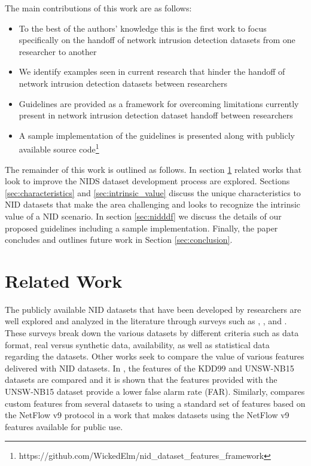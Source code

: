 \documentclass[conference]{IEEEtran}
\begin{document}
The main contributions of this work are as follows:

\begin{itemize}
    \item To the best of the authors' knowledge this is the first work to focus specifically on the handoff of network intrusion detection datasets from one researcher to another
    \item We identify examples seen in current research that hinder the handoff of network intrusion detection datasets between researchers
    \item Guidelines are provided as a framework for overcoming limitations currently present in network intrusion detection dataset handoff between researchers
    \item A sample implementation of the guidelines is presented along with publicly available source code\footnote{https://github.com/WickedElm/nid\_dataset\_features\_framework}
\end{itemize}

The remainder of this work is outlined as follows.
In section \ref{sec:related_work} related works that look to improve the NIDS dataset development process are explored.
Sections \ref{sec:characteristics} and \ref{sec:intrinsic_value} discuss the unique characteristics to NID datasets that make the area challenging and looks to recognize the intrinsic value of a NID scenario.
In section \ref{sec:nidddf} we discuss the details of our proposed guidelines including a sample implementation.
Finally, the paper concludes and outlines future work in Section \ref{sec:conclusion}.

\section{Related Work}\label{sec:related_work}

The publicly available NID datasets that have been developed by researchers are well explored and analyzed in the literature through surveys such as \cite{Chou2022}, \cite{yang2022systematic}, and \cite{ring2019survey}.
These surveys break down the various datasets by different criteria such as data format, real versus synthetic data, availability, as well as statistical data regarding the datasets.
Other works seek to compare the value of various features delivered with NID datasets.
In \cite{7809531}, the features of the KDD99 \cite{kdd99} and UNSW-NB15 \cite{unswnb15} datasets are compared and it is shown that the features provided with the UNSW-NB15 dataset provide a lower false alarm rate (FAR).
Similarly, \cite{sarhan2020netflow} compares custom features from several datasets to using a standard set of features based on the NetFlow v9 protocol \cite{netflowv9format} in a work that makes datasets using the NetFlow v9 features available for public use.
\end{document}
